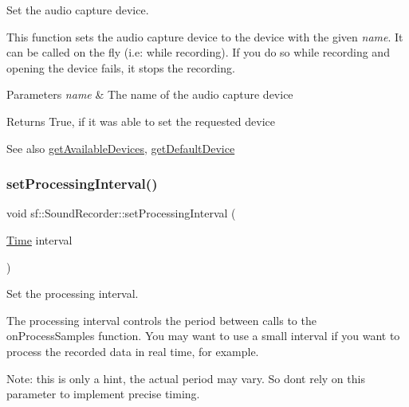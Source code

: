 Set the audio capture device. 

This function sets the audio capture device to the device with the given {\itshape name}. It can be called on the fly (i.\+e\+: while recording). If you do so while recording and opening the device fails, it stops the recording.


\begin{DoxyParams}{Parameters}
{\em name} & The name of the audio capture device\\
\hline
\end{DoxyParams}
\begin{DoxyReturn}{Returns}
True, if it was able to set the requested device
\end{DoxyReturn}
\begin{DoxySeeAlso}{See also}
\hyperlink{classsf_1_1_sound_recorder_a26198c5c11efcd61f426f326fe314afe}{get\+Available\+Devices}, \hyperlink{classsf_1_1_sound_recorder_ad1d450a80642dab4b632999d72a1bf23}{get\+Default\+Device} 
\end{DoxySeeAlso}
\mbox{\label{classsf_1_1_sound_recorder_a85b7fb8a86c08b5084f8f142767bccf6}} 
\subsubsection{\texorpdfstring{set\+Processing\+Interval()}{setProcessingInterval()}}
{\footnotesize\ttfamily void sf\+::\+Sound\+Recorder\+::set\+Processing\+Interval (\begin{DoxyParamCaption}\item[{\hyperlink{classsf_1_1_time}{Time}}]{interval }\end{DoxyParamCaption})\hspace{0.3cm}{\ttfamily [protected]}}



Set the processing interval. 

The processing interval controls the period between calls to the on\+Process\+Samples function. You may want to use a small interval if you want to process the recorded data in real time, for example.

Note\+: this is only a hint, the actual period may vary. So don\textquotesingle{}t rely on this parameter to implement precise timing.

